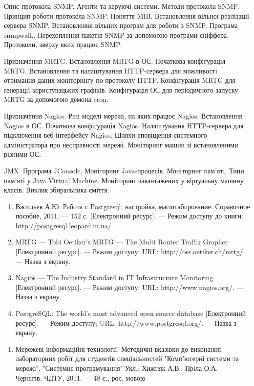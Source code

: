 \documentclass[a4paper,14pt,ukrainian]{extarticle}
\begin{document}
Опис протокола SNMP. Агенти та керуючі системи. Методи протокола SNMP. Принцип роботи протокола SNMP. Поняття MIB. Встановлення вільної реалізації сервера SNMP. Встановлення вільних програм для роботи з SNMP. Програма snmpwalk. Перехоплення пакетів SNMP за допомогою програми-сніффера. Протоколи, зверху яких працює SNMP.

Призначення MRTG. Встановлення MRTG в ОС. Початкова конфігурація MRTG. Встановлення та налаштування HTTP-сервера для можливості отримання даних моніторингу по протоколу HTTP. Конфігурація MRTG для ґенерації користувацьких графіків. Конфігурація ОС для періодичного запуску MRTG за допомогою демона cron.

Призначення Nagios. Ріні моделі мережі, на яких працює Nagios. Встановлення Nagios в ОС. Початкова конфігурація Nagios. Налаштування HTTP-сервера для підключення веб-інтерфейсу Nagios. Шляхи сповіщення системного адміністратора про несправності мережі. Моніторинг машин зі встановленими різними ОС.

JMX. Програма JConsole. Моніторинг Java-процесів. Моніторинг пам'яті. Типи пам'яті у Java Virtual Machine. Моніторинг завантажених у віртуальну машину класів. Виклик збиральника сміття.



\begin{enumerate}
\item Васильев А.Ю. Работа с Postgresql: настройка, масштабирование. Справочное пособие, 2011. --- 152 с. [Електронний ресурс]. --- Режим доступу до книги: http://postgresql.leopard.in.ua/.
\item MRTG --- Tobi Oetiker’s MRTG --- The Multi Router Traffik Grapher [Електронний ресурс]. --- Режим   доступу: URL: http://oss.oetiker.ch/mrtg/. --- Назва з екрану.
\item Nagios --- The Industry Standard in IT Infrastructure Monitoring [Електронний ресурс]. --- Режим доступу: URL: http://www.nagios.org/. --- Назва з екрану.
\item PostgreSQL: The world’s most advanced open source database [Електронний ресурс]. --- Режим доступу: URL: http://www.postgresql.org/. --- Назва з екрану.
\end{enumerate}


\begin{enumerate}
\item Мережеві інформаційні технології. Методичні вказівки до виконання лабораторних робіт для студентів спеціальностей "Комп'ютерні системи та мережі", "Системне програмування" Укл.: Хижняк А.В., Пріла О.А. --- Чернігів: ЧДТУ, 2011. --- 48 с., рос. мовою
\end{enumerate}
\end{document}

